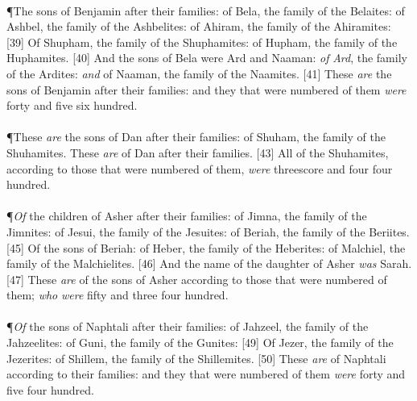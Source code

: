 \\
\P \textcolor[cmyk]{0.99998,1,0,0}{The sons of Benjamin after their families: of Bela, the family of the Belaites: of Ashbel, the family of the Ashbelites: of Ahiram, the family of the Ahiramites:}
[39] \textcolor[cmyk]{0.99998,1,0,0}{Of Shupham, the family of the Shuphamites: of Hupham, the family of the Huphamites.}
[40] \textcolor[cmyk]{0.99998,1,0,0}{And the sons of Bela were Ard and Naaman: \emph{of} \emph{Ard}, the family of the Ardites: \emph{and} of Naaman, the family of the Naamites.}
[41] \textcolor[cmyk]{0.99998,1,0,0}{These \emph{are} the sons of Benjamin after their families: and they that were numbered of them \emph{were} forty and five  six hundred.}\\
\\
\P \textcolor[cmyk]{0.99998,1,0,0}{These \emph{are} the sons of Dan after their families: of Shuham, the family of the Shuhamites. These \emph{are}  of Dan after their families.}
[43] \textcolor[cmyk]{0.99998,1,0,0}{All  of the Shuhamites, according to those that were numbered of them, \emph{were} threescore and four  four hundred.}\\
\\
\P \textcolor[cmyk]{0.99998,1,0,0}{\emph{Of} the children of Asher after their families: of Jimna, the family of the Jimnites: of Jesui, the family of the Jesuites: of Beriah, the family of the Beriites.}
[45] \textcolor[cmyk]{0.99998,1,0,0}{Of the sons of Beriah: of Heber, the family of the Heberites: of Malchiel, the family of the Malchielites.}
[46] \textcolor[cmyk]{0.99998,1,0,0}{And the name of the daughter of Asher \emph{was} Sarah.}
[47] \textcolor[cmyk]{0.99998,1,0,0}{These \emph{are}  of the sons of Asher according to those that were numbered of them; \emph{who} \emph{were} fifty and three  four hundred.}\\
\\
\P \textcolor[cmyk]{0.99998,1,0,0}{\emph{Of} the sons of Naphtali after their families: of Jahzeel, the family of the Jahzeelites: of Guni, the family of the Gunites:}
[49] \textcolor[cmyk]{0.99998,1,0,0}{Of Jezer, the family of the Jezerites: of Shillem, the family of the Shillemites.}
[50] \textcolor[cmyk]{0.99998,1,0,0}{These \emph{are}  of Naphtali according to their families: and they that were numbered of them \emph{were} forty and five  four hundred.}
